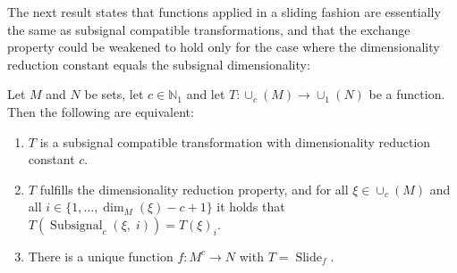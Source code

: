 \documentclass[journal]{IEEEtran}
\newcommand{\N}{\mathbb{N}}
\newcommand{\discint}[2]{\{#1,\dotsc,#2\}}
\newcommand{\inint}[2]{\in\discint{#1}{#2}}
\DeclareMathOperator{\Subsignal}{Subsignal}
\DeclareMathOperator{\Slide}{Slide}
\begin{document}
The next result states that functions applied in a sliding fashion are essentially the same as subsignal compatible transformations, and that the exchange property could be weakened to hold only for the case where the dimensionality reduction constant equals the subsignal dimensionality:
\begin{theorem}
\label{thm:sliding-subsignal}
Let $M$ and $N$ be sets, let $c\in\N_1$ and let $T\colon \cup_c(M) \to \cup_1(N)$ be a function.
Then the following are equivalent:
\begin{enumerate}
  \item \label{thm:sliding-subsignal-a} $T$ is a subsignal compatible transformation with dimensionality reduction constant $c$.
  \item \label{thm:sliding-subsignal-b} $T$ fulfills the dimensionality reduction property, and for all $\xi\in\cup_c(M)$ and all $i\inint{1}{\dim_M(\xi) - c + 1}$ it holds that $T(\Subsignal_c(\xi,\;i)) = T(\xi)_i$.
  \item \label{thm:sliding-subsignal-c} There is a unique function $f\colon M^c\to N$ with $T = \Slide_f$.
\end{enumerate}
\end{theorem}
\end{document}
